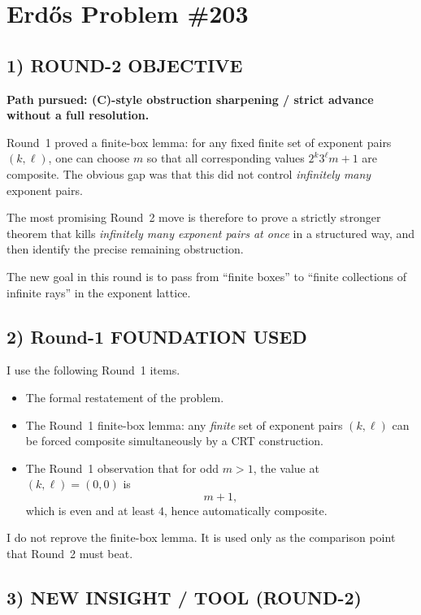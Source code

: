 \section{Erd\H{o}s Problem \#203}

\subsection*{1) ROUND-2 OBJECTIVE}

\textbf{Path pursued: (C)-style obstruction sharpening / strict advance without a full resolution.}

Round~1 proved a finite-box lemma: for any fixed finite set of exponent pairs $(k,\ell)$, one can choose $m$ so that all corresponding values $2^k3^\ell m+1$ are composite. The obvious gap was that this did not control \emph{infinitely many} exponent pairs.

The most promising Round~2 move is therefore to prove a strictly stronger theorem that kills \emph{infinitely many exponent pairs at once} in a structured way, and then identify the precise remaining obstruction.

The new goal in this round is to pass from ``finite boxes'' to ``finite collections of infinite rays'' in the exponent lattice.

\subsection*{2) Round-1 FOUNDATION USED}

I use the following Round~1 items.

\begin{itemize}
\item The formal restatement of the problem.
\item The Round~1 finite-box lemma: any \emph{finite} set of exponent pairs $(k,\ell)$ can be forced composite simultaneously by a CRT construction.
\item The Round~1 observation that for odd $m>1$, the value at $(k,\ell)=(0,0)$ is
\[
m+1,
\]
which is even and at least $4$, hence automatically composite.
\end{itemize}

I do not reprove the finite-box lemma. It is used only as the comparison point that Round~2 must beat.

\subsection*{3) NEW INSIGHT / TOOL (ROUND-2)}

